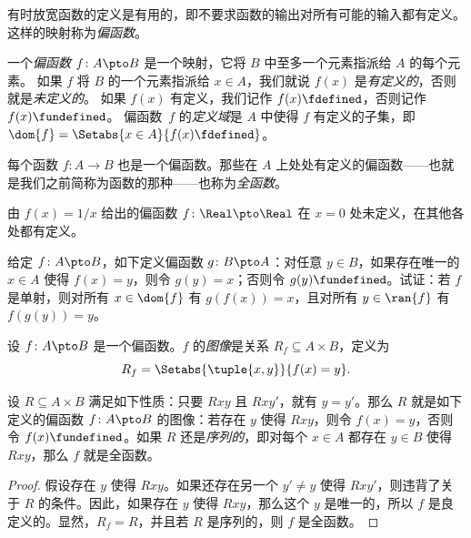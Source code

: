\documentclass[../../../include/open-logic-section]{subfiles}
\begin{document}


\begin{explain}
有时放宽函数的定义是有用的，即不要求函数的输出对所有可能的输入都有定义。
这样的映射称为\emph{偏函数}。
\end{explain}

\begin{defn}
一个\emph{偏函数} $f \colon A \pto B$ 是一个映射，它将 $B$ 中至多一个元素指派给 $A$ 的每个元素。
如果 $f$ 将 $B$ 的一个元素指派给 $x \in A$，我们就说 $f(x)$ 是\emph{有定义的}，否则就是\emph{未定义的}。
如果 $f(x)$ 有定义，我们记作 $f(x) \fdefined$，否则记作 $f(x) \fundefined$。
偏函数~$f$ 的\emph{定义域}是 $A$ 中使得 $f$ 有定义的子集，即$\dom{f} = \Setabs{x \in A}{f(x) \fdefined}$。
\end{defn}

\begin{ex}
每个函数 $f\colon A \to B$ 也是一个偏函数。那些在 $A$ 上处处有定义的偏函数——也就是我们之前简称为函数的那种——也称为\emph{全函数}。
\end{ex}

\begin{ex}
由 $f(x) = 1/x$ 给出的偏函数 $f \colon \Real \pto \Real$ 在 $x = 0$ 处未定义，在其他各处都有定义。
\end{ex}

\begin{prob}
给定 $f\colon A \pto B$，如下定义偏函数 $g\colon B \pto A$：对任意 $y \in B$，如果存在唯一的 $x \in A$ 使得 $f(x) = y$，则令 $g(y) = x$；否则令 $g(y) \fundefined$。试证：若 $f$ 是单射，则对所有 $x \in \dom{f}$ 有 $g(f(x)) = x$，且对所有 $y \in \ran{f}$ 有 $f(g(y)) = y$。
\end{prob}

\begin{defn}[偏函数的图像]
设 $f\colon A \pto B$ 是一个偏函数。$f$ 的\emph{图像}是关系 $R_f \subseteq A \times B$，定义为
\[
R_f = \Setabs{\tuple{x,y}}{f(x) = y}.
\]
\end{defn}

\begin{prop}
设 $R \subseteq A \times B$ 满足如下性质：只要 $Rxy$ 且 $Rxy'$，就有 $y = y'$。那么 $R$ 就是如下定义的偏函数 $f\colon A \pto B$ 的图像：若存在 $y$ 使得 $Rxy$，则令 $f(x) = y$，否则令 $f(x) \fundefined$。如果 $R$ 还是\emph{序列的}，即对每个 $x \in A$ 都存在 $y \in B$ 使得 $Rxy$，那么 $f$ 就是全函数。
\end{prop}

\begin{proof}
假设存在 $y$ 使得 $Rxy$。如果还存在另一个 $y' \neq y$ 使得 $Rxy'$，则违背了关于 $R$ 的条件。因此，如果存在 $y$ 使得 $Rxy$，那么这个 $y$ 是唯一的，所以 $f$ 是良定义的。显然，$R_f = R$，并且若 $R$ 是序列的，则 $f$ 是全函数。
\end{proof}
\end{document}
